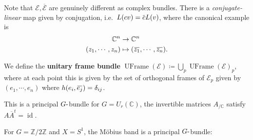 \begin{remark}

Note that \(\mathcal{E}, \overline{\mathcal{E}}\) are genuinely
different as complex bundles. There is a \emph{conjugate-linear} map
given by conjugation,
i.e.~\(L(cv) = \mkern 1.5mu\overline{\mkern-1.5muc\mkern-1.5mu}\mkern 1.5mu L(v)\),
where the canonical example is
\begin{align*}
{\mathbb{C}}^n &\to {\mathbb{C}}^n \\
(z_1, \cdots, z_n) &\mapsto (\mkern 1.5mu\overline{\mkern-1.5muz_1\mkern-1.5mu}\mkern 1.5mu, \cdots, \mkern 1.5mu\overline{\mkern-1.5muz_n\mkern-1.5mu}\mkern 1.5mu)
.\end{align*}

\end{remark}

\begin{definition}

We define the \textbf{unitary frame bundle}
\({\operatorname{UFrame}}(\mathcal{E}) \coloneqq\bigcup_p {\operatorname{UFrame}}(\mathcal{E})_p\),
where at each point this is given by the set of orthogonal frames of
\(\mathcal{E}_p\) given by \((e_1, \cdots, e_n)\) where
\(h(e_i , \mkern 1.5mu\overline{\mkern-1.5mue_j\mkern-1.5mu}\mkern 1.5mu ) = \delta_{ij}\).

\end{definition}

\begin{remark}

This is a principal \(G{\hbox{-}}\)bundle for \(G = U_r({\mathbb{C}})\),
the invertible matrices \(A_{/{\mathbb{C}}}\) satisfy
\(A \overline{A}^t = \operatorname{id}\).

\end{remark}

\begin{example}

For \(G={\mathbb{Z}}/2{\mathbb{Z}}\) and \(X= S^1\), the Möbius band is
a principal \(G{\hbox{-}}\)bundle:

\begin{figure}
\centering
{}
\end{figure}

\end{example}

